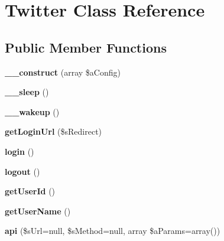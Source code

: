 \hypertarget{class_twitter}{\section{Twitter Class Reference}
\label{class_twitter}
}
\subsection*{Public Member Functions}
\begin{DoxyCompactItemize}
\item 
\hypertarget{class_twitter_a57f90bd19be8da7ffbc7a8558da607ed}{{\bfseries \-\_\-\-\_\-construct} (array \$a\-Config)}\label{class_twitter_a57f90bd19be8da7ffbc7a8558da607ed}

\item 
\hypertarget{class_twitter_a32dc8583db225b48bcb876e29e4d4da8}{{\bfseries \-\_\-\-\_\-sleep} ()}\label{class_twitter_a32dc8583db225b48bcb876e29e4d4da8}

\item 
\hypertarget{class_twitter_abd8f6f7519b9556c433f7c5fe901b4af}{{\bfseries \-\_\-\-\_\-wakeup} ()}\label{class_twitter_abd8f6f7519b9556c433f7c5fe901b4af}

\item 
\hypertarget{class_twitter_a5dd2cb293b3af98583506091c9f15150}{{\bfseries get\-Login\-Url} (\$s\-Redirect)}\label{class_twitter_a5dd2cb293b3af98583506091c9f15150}

\item 
\hypertarget{class_twitter_a74c3d6350b9c0aae000b959abf2a10ec}{{\bfseries login} ()}\label{class_twitter_a74c3d6350b9c0aae000b959abf2a10ec}

\item 
\hypertarget{class_twitter_ab40747b8341eb3e28793ea11e8d93f90}{{\bfseries logout} ()}\label{class_twitter_ab40747b8341eb3e28793ea11e8d93f90}

\item 
\hypertarget{class_twitter_a483eb2a99344496125183c5a033e892f}{{\bfseries get\-User\-Id} ()}\label{class_twitter_a483eb2a99344496125183c5a033e892f}

\item 
\hypertarget{class_twitter_a6eb53faab2a31299c7e87d9d717068a2}{{\bfseries get\-User\-Name} ()}\label{class_twitter_a6eb53faab2a31299c7e87d9d717068a2}

\item 
\hypertarget{class_twitter_a3e3fbe097382e62ef304fc16bb90903f}{{\bfseries api} (\$s\-Url=null, \$s\-Method=null, array \$a\-Params=array())}\label{class_twitter_a3e3fbe097382e62ef304fc16bb90903f}


\end{DoxyCompactItemize}
